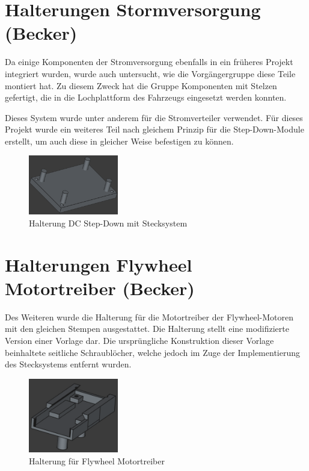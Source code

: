 \section{Halterungen Stormversorgung (Becker)}

Da einige Komponenten der Stromversorgung ebenfalls in ein früheres Projekt integriert wurden, wurde auch untersucht, wie die Vorgängergruppe diese Teile montiert hat.
Zu diesem Zweck hat die Gruppe Komponenten mit Stelzen gefertigt, die in die Lochplattform des Fahrzeugs eingesetzt werden konnten.

Dieses System wurde unter anderem für die Stromverteiler verwendet. 
Für dieses Projekt wurde ein weiteres Teil nach gleichem Prinzip für die Step-Down-Module erstellt, um auch diese in gleicher Weise befestigen zu können.

\begin{figure}[ht]
    \centering
    \includegraphics[width=0.35\textwidth, keepaspectratio]{images/becker_cad_powerplate.png}
    \caption{Halterung DC Step-Down mit Stecksystem}
\end{figure}

\section{Halterungen Flywheel Motortreiber (Becker)}

Des Weiteren wurde die Halterung für die Motortreiber der Flywheel-Motoren mit den gleichen Stempen ausgestattet. 
Die Halterung stellt eine modifizierte Version einer Vorlage \cite{cad_flywheel_blueprint} dar. 
Die ursprüngliche Konstruktion dieser Vorlage beinhaltete seitliche Schraublöcher, welche jedoch im Zuge der Implementierung des Stecksystems entfernt wurden.

\begin{figure}[ht]
    \centering
    \includegraphics[width=0.35\textwidth, keepaspectratio]{images/becker_cad_flywheel.png}
    \caption{Halterung für Flywheel Motortreiber}
\end{figure}

